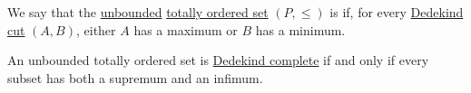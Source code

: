 \begin{definition}\label{def:dedekind_completeness}
  We say that the \hyperref[def:extremal_points/bounds]{unbounded} \hyperref[def:totally_ordered_set]{totally ordered set} \( (P, \leq) \) is  if, for every \hyperref[def:dedekind_cut]{Dedekind cut} \( (A, B) \), either \( A \) has a maximum or \( B \) has a minimum.
\end{definition}

\begin{proposition}\label{thm:dedekind_completeness_unbounded_characterization}
  An unbounded totally ordered set is \hyperref[def:dedekind_completeness]{Dedekind complete} if and only if every   subset has both a supremum and an infimum.
\end{proposition}
